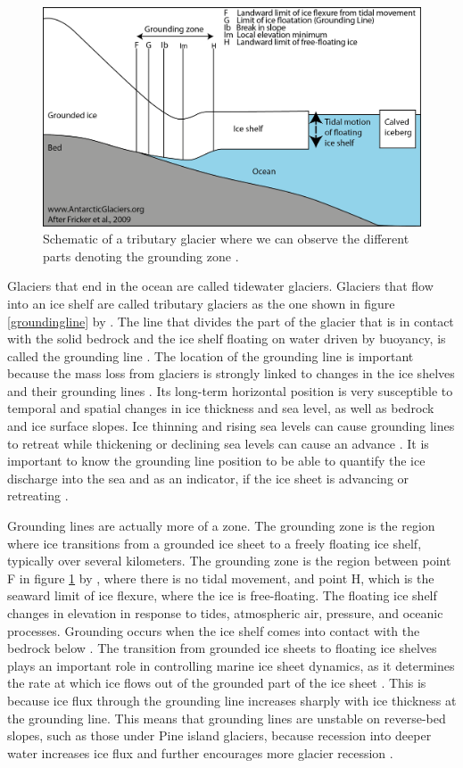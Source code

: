 \documentclass{article}
\begin{document}
\begin{figure}[!h]
	\centering
	\includegraphics[width=0.7\linewidth]{../fig/groundingzone.png}
	\caption{Schematic of a tributary glacier where we can observe the different parts denoting the grounding zone \cite{fricker2009mapping}.}
	\label{groundingzone}
\end{figure}

Glaciers that end in the ocean are called tidewater glaciers. Glaciers that flow into an ice shelf are called tributary glaciers as the one shown in figure \ref{groundingline} by \cite{parizek2010implications}. The line that divides the part of the glacier that is in contact with the solid bedrock and the ice shelf floating on water driven by buoyancy, is called the grounding line \cite{cheng2019full}. The location of the grounding line is important because the mass loss from glaciers is strongly linked to changes in the ice shelves and their grounding lines \cite{brunt2010mapping,pritchard2012antarctic}. Its long-term horizontal position is very susceptible to temporal and spatial changes in ice thickness and sea level, as well as bedrock and ice surface slopes. Ice thinning and rising sea levels can cause grounding lines to retreat while thickening or declining sea levels can cause an advance \cite{friedl2020remote}. It is important to know the grounding line position to be able to quantify the ice discharge into the sea and as an indicator, if the ice sheet is advancing or retreating \cite{konrad2018net}.

Grounding lines are actually more of a zone. The grounding zone is the region where ice transitions from a grounded ice sheet to a freely floating ice shelf, typically over several kilometers. The grounding zone is the region between point F in figure \ref{groundingzone} by \cite{fricker2009mapping}, where there is no tidal movement, and point H, which is the seaward limit of ice flexure, where the ice is free-floating. The floating ice shelf changes in elevation in response to tides, atmospheric air, pressure, and oceanic processes. Grounding occurs when the ice shelf comes into contact with the bedrock below \cite{fricker2009mapping}. The transition from grounded ice sheets to floating ice shelves plays an important role in controlling marine ice sheet dynamics, as it determines the rate at which ice flows out of the grounded part of the ice sheet \cite{schoof2007ice}. This is because ice flux through the grounding line increases sharply with ice thickness at the grounding line. This means that grounding lines are unstable on reverse-bed slopes, such as those under Pine island glaciers, because recession into deeper water increases ice flux and further encourages more glacier recession \cite{schoof2007marine}.
\end{document}
